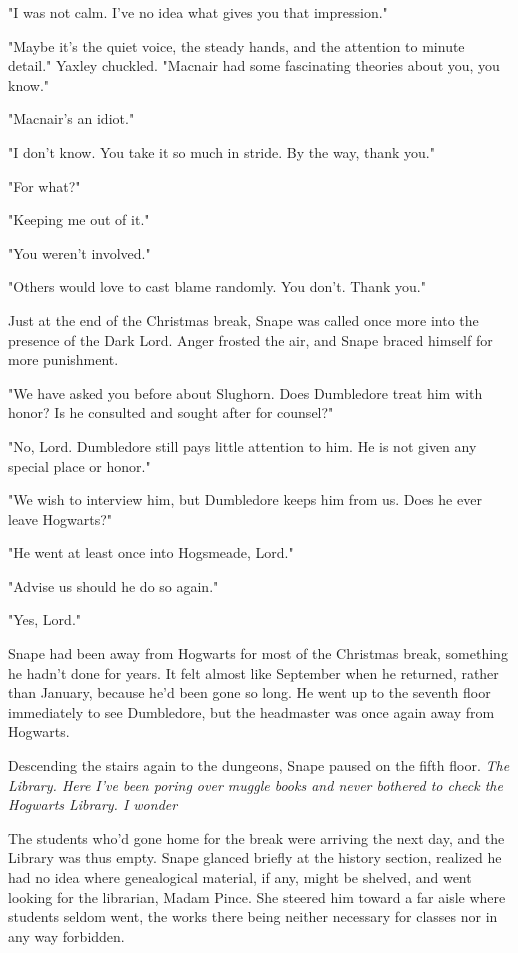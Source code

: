 "I was not calm. I've no idea what gives you that impression."

"Maybe it's the quiet voice, the steady hands, and the attention to minute detail." Yaxley chuckled. "Macnair had some fascinating theories about you, you know."

"Macnair's an idiot."

"I don't know. You take it so much in stride. By the way, thank you."

"For what?"

"Keeping me out of it."

"You weren't involved."

"Others would love to cast blame randomly. You don't. Thank you."

Just at the end of the Christmas break, Snape was called once more into the presence of the Dark Lord. Anger frosted the air, and Snape braced himself for more punishment.

"We have asked you before about Slughorn. Does Dumbledore treat him with honor? Is he consulted and sought after for counsel?"

"No, Lord. Dumbledore still pays little attention to him. He is not given any special place or honor."

"We wish to interview him, but Dumbledore keeps him from us. Does he ever leave Hogwarts?"

"He went at least once into Hogsmeade, Lord."

"Advise us should he do so again."

"Yes, Lord."

Snape had been away from Hogwarts for most of the Christmas break, something he hadn't done for years. It felt almost like September when he returned, rather than January, because he'd been gone so long. He went up to the seventh floor immediately to see Dumbledore, but the headmaster was once again away from Hogwarts.

Descending the stairs again to the dungeons, Snape paused on the fifth floor. \emph{The Library. Here I've been poring over muggle books and never bothered to check the Hogwarts Library. I wonder{\el}}

The students who'd gone home for the break were arriving the next day, and the Library was thus empty. Snape glanced briefly at the history section, realized he had no idea where genealogical material, if any, might be shelved, and went looking for the librarian, Madam Pince. She steered him toward a far aisle where students seldom went, the works there being neither necessary for classes nor in any way forbidden.

